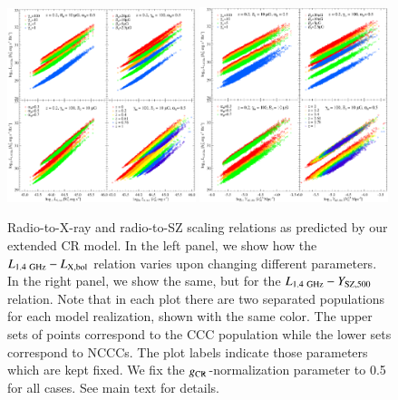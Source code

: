 \documentclass[useAMS,usenatbib]{mn2e}
\begin{document}
\begin{figure} 
\centering
\includegraphics[width=0.49\textwidth]{figures/PL_relation_testing_gimp.eps}
\includegraphics[width=0.49\textwidth]{figures/PSZ_relation_testing_gimp.eps}
\caption{Radio-to-X-ray and radio-to-SZ scaling relations as predicted by our
  extended CR model. In the left panel, we show how the
  $L_{1.4~{\mathrm{GHz}}}-L_{{\mathrm{X,bol}}}$ relation varies upon changing different
  parameters. In the right panel, we show the same, but for the
  $L_{1.4~{\mathrm{GHz}}}-Y_{{\mathrm{SZ}},500}$ relation. Note that in each plot there
  are two separated populations for each model realization, shown with the same
  color. The upper sets of points correspond to the CCC population while the
  lower sets correspond to NCCCs. The plot labels indicate those parameters
  which are kept fixed. We fix the $g_{{\mathrm{CR}}}$-normalization parameter to 0.5
  for all cases. See main text for details.}
\label{fig:SR}
\end{figure}
\end{document}
